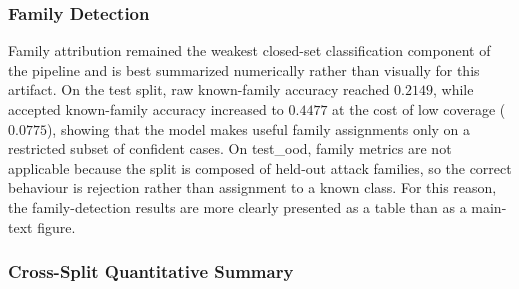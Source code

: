 \subsubsection{Family Detection}

Family attribution remained the weakest closed-set classification component of the pipeline and is best summarized numerically rather than visually for this artifact. On the test split, raw known-family accuracy reached $0.2149$, while accepted known-family accuracy increased to $0.4477$ at the cost of low coverage ($0.0775$), showing that the model makes useful family assignments only on a restricted subset of confident cases. On test\_ood, family metrics are not applicable because the split is composed of held-out attack families, so the correct behaviour is rejection rather than assignment to a known class. For this reason, the family-detection results are more clearly presented as a table than as a main-text figure.

\subsubsection{Cross-Split Quantitative Summary}

\begin{table}[htbp]
\centering
\caption{Cross-split benign vs malicious detection metrics for the OOD lower-threshold artifact.}
\label{tab:ood-lowerthrd-benign-malicious}
\end{table}

\begin{table}[htbp]
\centering
\caption{Cross-split family detection metrics for the OOD lower-threshold artifact.}
\label{tab:ood-lowerthrd-family}
\end{table}

